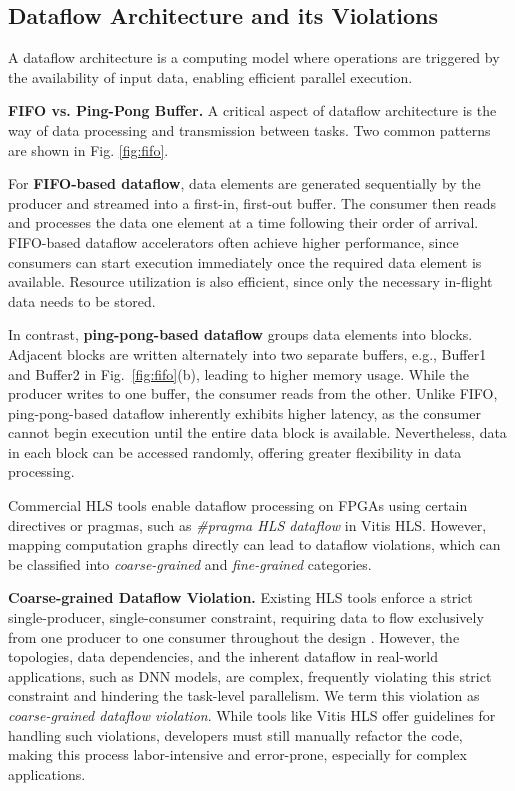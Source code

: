 \documentclass[conference]{IEEEtran}
\begin{document}
\subsection{Dataflow Architecture and its Violations} \label{sec:background-violation}
A dataflow architecture is a computing model where operations are triggered by the availability of input data, enabling efficient parallel execution. 

\textbf{FIFO vs. Ping-Pong Buffer.} A critical aspect of dataflow architecture is the way of data processing and transmission between tasks. Two common patterns are  shown in Fig. \ref{fig:fifo}. 

For \textbf{FIFO-based dataflow}, data elements are generated sequentially by the producer and streamed into a first-in, first-out buffer. The consumer then reads and processes the data one element at a time following their order of arrival. FIFO-based dataflow accelerators often achieve higher performance, since consumers can start execution immediately once the required data element is available. Resource utilization is also efficient, since only the necessary in-flight data needs to be stored. 

In contrast, \textbf{ping-pong-based dataflow} groups data elements into blocks. Adjacent blocks are written alternately into two separate buffers, e.g., Buffer1 and Buffer2 in Fig.~\ref{fig:fifo}(b), leading to higher memory usage. While the producer writes to one buffer, the consumer reads from the other. Unlike FIFO, ping-pong-based dataflow inherently exhibits higher latency, as the consumer cannot begin execution until the entire data block is available. 
Nevertheless, data in each block can be accessed randomly, offering greater flexibility in data processing.

Commercial HLS tools enable dataflow processing on FPGAs using certain directives or pragmas, such as \textit{\#pragma HLS dataflow} in Vitis HLS. However, mapping computation graphs directly 
can lead to dataflow violations, which can be classified into \textit{coarse-grained} and \textit{fine-grained} categories.

\textbf{Coarse-grained Dataflow Violation.}
Existing HLS tools enforce a strict single-producer, single-consumer constraint, requiring data to flow exclusively from one producer to one consumer throughout the design \cite{hlsdataflow}. However, the topologies, data dependencies, and the inherent dataflow in real-world applications, such as DNN models, are complex, frequently violating this strict constraint and hindering the task-level parallelism. We term this violation as \textit{coarse-grained dataflow violation}. 
While tools like Vitis HLS offer guidelines for handling such violations, developers must still manually refactor the code, making this process labor-intensive and error-prone, especially for complex applications. 
\end{document}
